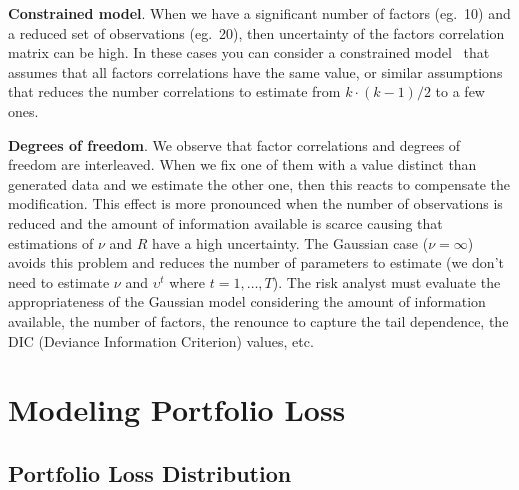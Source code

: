 \documentclass[11pt,fleqn]{book} %
\begin{document}
\textbf{Constrained model}. When we have a significant number of factors 
(eg.\ 10) and a reduced set of observations (eg.\ 20), then uncertainty of 
the factors correlation matrix can be high. In these cases you can consider 
a constrained model~\cite{roncalli:2004} that assumes that all factors
correlations have the same value, or similar assumptions that reduces the 
number correlations to estimate from $k \cdot(k-1)/2$ to a few ones.

\textbf{Degrees of freedom}. We observe that factor correlations and degrees 
of freedom are interleaved. When we fix one of them with a value distinct 
than generated data and we estimate the other one, then this reacts to 
compensate the modification. This effect is more pronounced when the number 
of observations is reduced and the amount of 
information available is scarce causing that estimations of $\nu$ and $R$
have a high uncertainty. The Gaussian case ($\nu = \infty$) avoids this 
problem and reduces the number of parameters to estimate (we don't need to 
estimate $\nu$ and $\upsilon^t$ where $t=1,\dots,T$). 
The risk analyst must evaluate the appropriateness of the Gaussian model 
considering the amount of information available, the number of factors, 
the renounce to capture the tail dependence, the DIC (Deviance Information 
Criterion) values, etc.


\chapter{Modeling Portfolio Loss}

\section{Portfolio Loss Distribution}
\end{document}

